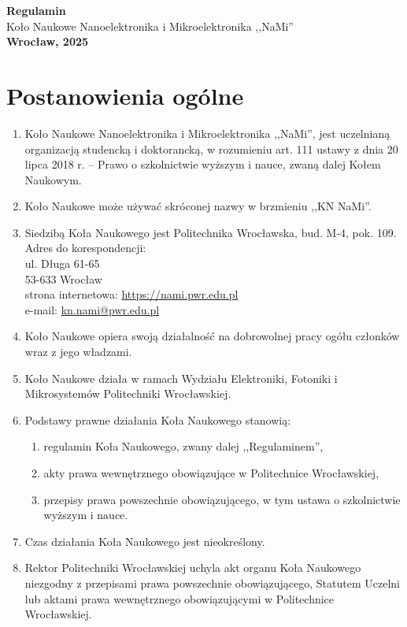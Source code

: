 \documentclass[12pt,a4paper]{article}
\begin{document}
\begin{center}
    {\LARGE \textbf{Regulamin}} \\[0.5cm]
    {\Large {Koło Naukowe Nanoelektronika i Mikroelektronika ,,NaMi''}} \\
    \vspace{0.5cm}
    {\Large \textbf{Wrocław, 2025}}
\end{center}

\newpage
\section{Postanowienia ogólne}
\begin{enumerate}
    \item Koło Naukowe Nanoelektronika i Mikroelektronika ,,NaMi'', jest uczelnianą organizacją studencką i doktorancką, w rozumieniu art. 111 ustawy z dnia 20 lipca 2018 r. – Prawo o szkolnictwie wyższym i nauce, zwaną dalej Kołem Naukowym.
    \item Koło Naukowe może używać skróconej nazwy w brzmieniu ,,KN NaMi''.
    \item Siedzibą Koła Naukowego jest Politechnika Wrocławska, bud. M-4, pok. 109. \\
    Adres do korespondencji: \\
    ul. Długa 61-65 \\
    53-633 Wrocław \\
    strona internetowa: \url{https://nami.pwr.edu.pl} \\
    e-mail: \href{mailto:kn.nami@pwr.edu.pl}{kn.nami@pwr.edu.pl}

    \item Koło Naukowe opiera swoją działalność na dobrowolnej pracy ogółu członków wraz z jego władzami.
    \item Koło Naukowe działa w ramach Wydziału Elektroniki, Fotoniki i Mikrosystemów Politechniki Wrocławskiej.
    \item Podstawy prawne działania Koła Naukowego stanowią:
    \begin{enumerate}
        \item regulamin Koła Naukowego, zwany dalej ,,Regulaminem'',
        \item akty prawa wewnętrznego obowiązujące w Politechnice Wrocławskiej,
        \item przepisy prawa powszechnie obowiązującego, w tym ustawa o szkolnictwie wyższym i nauce.
    \end{enumerate}
    \item Czas działania Koła Naukowego jest nieokreślony.
    \item Rektor Politechniki Wrocławskiej uchyla akt organu Koła Naukowego niezgodny z przepisami prawa powszechnie obowiązującego, Statutem Uczelni lub aktami prawa wewnętrznego obowiązującymi w Politechnice Wrocławskiej.
\end{enumerate}
\end{document}
